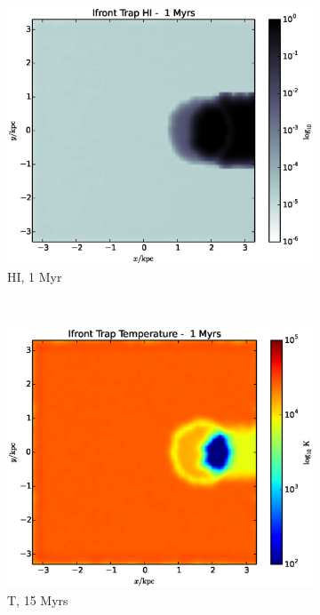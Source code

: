\begin{figure}
        \centering
        \begin{subfigure}[b]{0.3\textwidth}
                \includegraphics[width=\textwidth]{graphics/ifrontTrap00010HI.eps}
                \caption{HI, 1 Myr}
                \label{fig:ifronttrap2a}
        \end{subfigure}
        ~ 
        \begin{subfigure}[b]{0.3\textwidth}
                \includegraphics[width=\textwidth]{graphics/ifrontTrap00010Temp.eps}
                \caption{T, 15 Myrs}
                \label{fig:ifronttrap2b}
        \end{subfigure}
        \caption[]{}
        \label{fig:ifronttrap2}
\end{figure}


